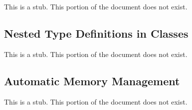This is a stub.  This portion of the document does not exist.

\subsection{Nested Type Definitions in Classes}
\label{Nested_Type_Definitions_in_Classes}

This is a stub.  This portion of the document does not exist.

\subsection{Automatic Memory Management}
\label{Automatic_Memory_Management}

This is a stub.  This portion of the document does not exist.
